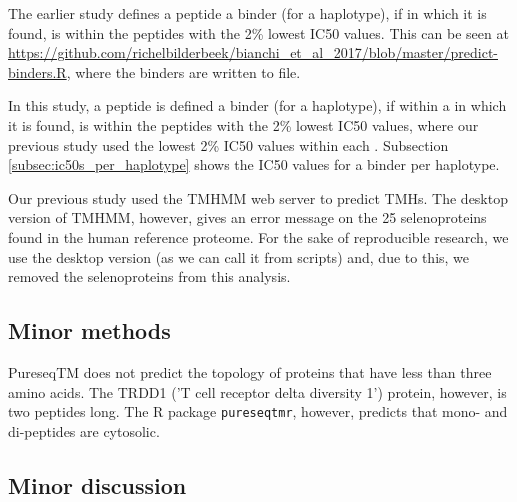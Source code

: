 
The earlier study defines a peptide a binder (for a haplotype), 
if  in which it is found, 
is within the peptides with the 2\% lowest IC50 values.
This can be seen at \url{https://github.com/richelbilderbeek/bianchi_et_al_2017/blob/master/predict-binders.R},
where the binders are written to file.

In this study, a peptide is defined a binder (for a haplotype), 
if within a  in which it is found, 
is within the peptides with the 2\% lowest IC50 values,
where our previous study used the lowest 2\% IC50 values
within each .
Subsection \ref{subsec:ic50s_per_haplotype} shows the IC50 values
for a binder per haplotype.


Our previous study used the TMHMM web server
to predict TMHs.
The desktop version of TMHMM, however, gives an
error message on the 25 selenoproteins found in the human
reference proteome.
For the sake of reproducible research, we use the desktop version (as
we can call it from scripts) and, due to this, we removed the
selenoproteins from this analysis.

\subsection{Minor methods}

PureseqTM does not predict the topology
of proteins that have less than three amino acids. 
The TRDD1 ('T cell receptor delta diversity 1') protein,
however, is two peptides long. 
The R package \verb;pureseqtmr;, however, 
predicts that mono- and di-peptides are cytosolic.

\subsection{Minor discussion}

